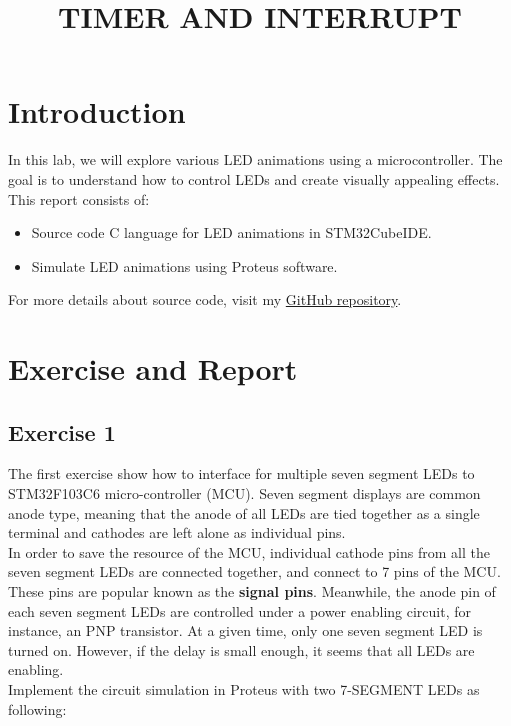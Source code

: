 \documentclass[twoside, final]{hcmut_report}
\title{\Large TIMER AND INTERRUPT}
\begin{document}
\coverpage
\pagestyle{empty}
\tableofcontents
\pagestyle{fancy}
\pagebreak
\section{Introduction}
In this lab, we will explore various LED animations using a microcontroller. The goal is to understand how to control LEDs and create visually appealing effects.
This report consists of:
\begin{itemize}
    \item Source code C language for LED animations in STM32CubeIDE.
    \item Simulate LED animations using Proteus software.
\end{itemize}
For more details about source code, visit my \href{https://batmaon512.github.io/Microcontroller-251}{GitHub repository}.

\section{Exercise and Report}
\subsection{Exercise 1}
The first exercise show how to interface for multiple seven segment LEDs to STM32F103C6 micro-controller (MCU). Seven segment displays are common anode type, meaning that the anode of all LEDs are tied together as a single terminal and cathodes are left alone as individual pins. \\

In order to save the resource of the MCU, individual cathode pins from all the seven segment LEDs are connected together, and connect to 7 pins of the MCU. These pins are popular known as the \textbf{signal pins}. Meanwhile, the anode pin of each seven segment LEDs are controlled under a power enabling circuit, for instance, an PNP transistor. At a given time, only one seven segment LED is turned on. However, if the delay is small enough, it seems that all LEDs are enabling. \\

Implement the circuit simulation in Proteus with two 7-SEGMENT LEDs as following:
\end{document}
